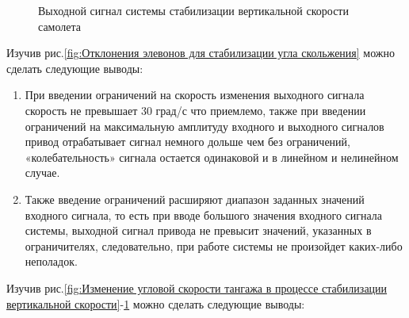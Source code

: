 \begin{figure}[H]
    \caption{Выходной сигнал системы стабилизации вертикальной скорости самолета}
    \label{fig:Входной сигнал системы стабилизации вертикальной скорости}
\end{figure}



\begin{center}
\end{center}

Изучив рис.\ref{fig:Отклонения элевонов для стабилизации угла скольжения} можно сделать следующие выводы:
\begin{enumerate}
    \item При введении ограничений на скорость изменения выходного сигнала скорость не превышает 30 град/с что приемлемо, также при введении ограничений на максимальную амплитуду входного и выходного сигналов привод отрабатывает сигнал немного дольше чем без ограничений, «колебательность» сигнала остается одинаковой и в линейном и нелинейном случае.
    \item Также введение ограничений расширяют диапазон заданных значений входного сигнала, то есть при вводе большого значения входного сигнала системы, выходной сигнал привода не превысит значений, указанных в ограничителях, следовательно, при работе системы не произойдет каких-либо неполадок. 
\end{enumerate}
Изучив рис.\ref{fig:Изменение угловой скорости тангажа в процессе стабилизации вертикальной скорости}-\ref{fig:Входной сигнал системы стабилизации вертикальной скорости} можно сделать следующие выводы:

